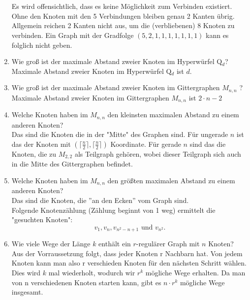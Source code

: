 \begin{enumerate}[label=(\alph*)]
\\\\
        Es wird offensichtlich, dass es keine Möglichkeit zum Verbinden existiert. Ohne den Knoten mit 
        den 5 Verbindungen bleiben genau 2 Kanten übrig. Allgemein reichen 2 Kanten  nicht aus, um die 
        (verbliebenen) 8 Knoten zu verbinden. Ein Graph mit der Gradfolge $(5,2,1,1,1,1,1,1,1)$ kann es 
        folglich nicht geben. 
         
        \item Wie groß ist der maximale Abstand zweier Knoten im Hyperwürfel Q$_d$? \\
        Maximale Abstand zweier Knoten im Hyperwürfel Q$_d$ ist $d$.
        
        \item Wie groß ist der maximale Abstand zweier Knoten im Gittergraphen $M_{n,n}$ ? \\
        Maximale Abstand zweier Knoten im Gittergraphen $M_{n,n}$ ist $2\cdot n - 2$
        
        \item Welche Knoten haben im $M_{n,n}$ den kleinsten maximalen Abstand zu einem anderen Knoten? \\
        Das sind die Knoten die in der "Mitte" des Graphen sind. Für ungerade $n$ ist das der Knoten mit
        $(\big\lceil\frac{n}{2}\big\rceil,\big\lceil\frac{n}{2}\big\rceil)$ Koordinate. 
        Für gerade $n$ sind das die Knoten, die zu $M_{2,2}$ als Teilgraph gehören, wobei dieser Teilgraph 
        sich auch in die Mitte des Gittergraphen befindet.
        
        \item Welche Knoten haben im $M_{n,n}$ den größten maximalen Abstand zu einem anderen Knoten? \\
        Das sind die Knoten, die ''an den Ecken'' vom Graph sind. \\
        Folgende Knotenzählung (Zählung beginnt von 1 weg) ermittelt die "gesuchten Knoten":
        $$v_1, v_n, v_{n^2-n+1} \text{ und } v_{n^2}.$$
        
        \item Wie viele Wege der Länge $k$ enthält ein $r$-regulärer Graph mit $n$ Knoten? \\
        Aus der Vorraussetzung folgt, dass jeder Knoten r Nachbarn hat. Von jedem Knoten kann man also r verschieden Knoten für den nächsten Schritt wählen. Dies wird $k$ mal wiederholt, wodurch wir $r^k$ mögliche Wege erhalten. Da man von n verschiedenen Knoten starten kann, gibt es $n \cdot r^k$ mögliche Wege insgesamt.
        

\end{enumerate}

